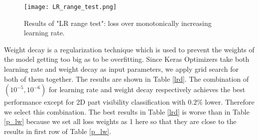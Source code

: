 \begin{figure}[H]		
	\texttt{[image: LR\_range\_test.png]}
	\caption{Results of "LR range test": loss over monotonically increasing learning rate. }
	\centering
	\label{figure:lr_test}
\end{figure}

Weight decay is a regularization technique which is used to prevent the weights of the model getting too big as to be overfitting. Since Keras Optimizers \cite{chollet2015keras} take both learning rate and weight decay as input parameters, we apply grid search for both of them together. The results are shown in Table \ref{lrd}. The combination of $(10^{-5}, 10^{-6})$ for learning rate and weight decay respectively achieves the best performance except for 2D part visibility classification with $0.2\%$ lower. Therefore we select this combination. The best results in Table \ref{lrd} is worse than in Table \ref{p_lw} because we set all loss weights as 1 here so that they are close to the results in first row of Table \ref{p_lw}.

